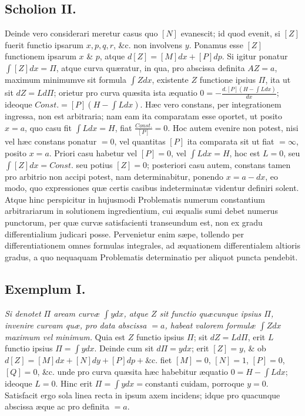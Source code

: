 \subsection*{Scholion II.}
Deinde vero considerari meretur casus quo $[N]$ evanescit; id quod evenit, si $[Z]$ fuerit functio ipsarum $x,p,q,r$, \&c. non involvens $y$. Ponamus esse $[Z]$ functionem ipsarum $x$ \& $p$, atque $d[Z]=[M]dx+[P]dp$. Si igitur ponatur $\int[Z]dx=\Pi$, atque curva quæratur, in qua, pro abscissa definita $AZ=a$, maximum minimumve sit formula $\int Zdx$, existente $Z$ functione ipsius $\Pi$, ita ut sit $dZ=Ld\Pi$; orietur pro curva quæsita ista æquatio $0=-\frac{d.[P](H-\int Ldx)}{dx}$; ideoque $\mathit{Const.}=[P](H-\int Ldx)$. Hæc vero constans, per integrationem ingressa, non est arbitraria; nam eam ita comparatam esse oportet, ut posito $x=a$, quo casu fit $\int Ldx=H$, fiat $\frac{\mathit{Const.}}{[P]}=0$. Hoc autem evenire non potest, nisi vel hæc constans ponatur $=0$, vel quantitas $[P]$ ita comparata sit ut fiat $=\infty$, posito $x=a$. Priori casu habetur vel $[P]=0$, vel $\int Ldx=H$, hoc est $L=0$, seu $\int[Z]dx=\mathit{Const.}$ seu potius $[Z]=0$; posteriori casu autem, constans tamen pro arbitrio non accipi potest, nam determinabitur, ponendo $x=a-dx$, eo modo, quo expressiones quæ certis casibus indeterminatæ videntur definiri solent. Atque hinc perspicitur in hujusmodi Problematis numerum constantium arbitrariarum in solutionem ingredientium, cui æqualis sumi debet numerus punctorum, per quæ curvæ satisfacienti transeundum est, non ex gradu differentialium judicari posse. Pervenietur enim sæpe, tollendo per differentiationem omnes formulas integrales, ad æquationem differentialem altioris gradus, a quo nequaquam Problematis determinatio per aliquot puncta pendebit.
\subsection*{Exemplum I.}
\textit{Si denotet $\Pi$ aream curvæ $\int ydx$, atque $Z$ sit functio quæcunque ipsius $\Pi$, invenire curvam quæ, pro data abscissa $=a$, habeat valorem formulæ $\int Zdx$ maximum vel minimum.}
Quia est $Z$ functio ipsius $\Pi$; sit $dZ=Ld\Pi$, erit $L$ functio ipsius $\Pi=\int ydx$. Deinde cum sit $d\Pi=ydx$; erit $[Z]=y$, \& ob $d[Z]=[M]dx+[N]dy+[P]dp+\text{\&c.}$ fiet $[M]=0$, $[N]=1$, $[P]=0$, $[Q]=0$, \&c. unde pro curva quæsita hæc habebitur æquatio $0=H-\int Ldx$; ideoque $L=0$. Hinc erit $\Pi=\int ydx=\text{constanti cuidam}$, porroque $y=0$. Satisfacit ergo sola linea recta in ipsum axem incidens; idque pro quacunque abscissa æque ac pro definita $=a$.
